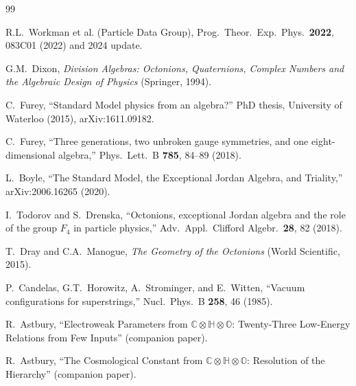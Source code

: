 \documentclass[12pt,a4paper]{article}
\theoremstyle{definition}
\theoremstyle{remark}
\newcommand{\Oct}{\mathbb{O}}
\newcommand{\Quat}{\mathbb{H}}
\newcommand{\Comp}{\mathbb{C}}
\begin{document}
\begin{thebibliography}{99}

R.L.~Workman et al. (Particle Data Group),
Prog.\ Theor.\ Exp.\ Phys.\ \textbf{2022}, 083C01 (2022) and 2024 update.

G.M.~Dixon,
\emph{Division Algebras: Octonions, Quaternions, Complex Numbers and the 
Algebraic Design of Physics} (Springer, 1994).

C.~Furey,
``Standard Model physics from an algebra?''
PhD thesis, University of Waterloo (2015), arXiv:1611.09182.

C.~Furey,
``Three generations, two unbroken gauge symmetries, and one eight-dimensional algebra,''
Phys.\ Lett.\ B \textbf{785}, 84--89 (2018).

L.~Boyle,
``The Standard Model, the Exceptional Jordan Algebra, and Triality,''
arXiv:2006.16265 (2020).

I.~Todorov and S.~Drenska,
``Octonions, exceptional Jordan algebra and the role of the group $F_4$ 
in particle physics,''
Adv.\ Appl.\ Clifford Algebr.\ \textbf{28}, 82 (2018).

T.~Dray and C.A.~Manogue,
\emph{The Geometry of the Octonions} (World Scientific, 2015).

P.~Candelas, G.T.~Horowitz, A.~Strominger, and E.~Witten,
``Vacuum configurations for superstrings,''
Nucl.\ Phys.\ B \textbf{258}, 46 (1985).

R.~Astbury, ``Electroweak Parameters from 
$\Comp\otimes\Quat\otimes\Oct$: Twenty-Three Low-Energy Relations from Few Inputs'' 
(companion paper).

R.~Astbury, ``The Cosmological Constant from 
$\Comp\otimes\Quat\otimes\Oct$: Resolution of the Hierarchy'' 
(companion paper).

\end{thebibliography}
\end{document}
